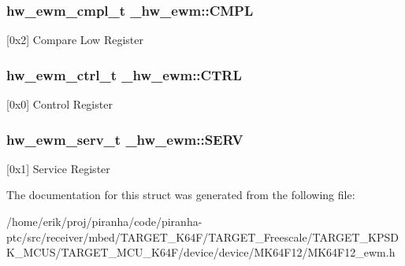 \subsubsection[{\texorpdfstring{C\+M\+PL}{CMPL}}]{ {\bf hw\+\_\+ewm\+\_\+cmpl\+\_\+t} \+\_\+hw\+\_\+ewm\+::\+C\+M\+PL}\hypertarget{struct__hw__ewm_abe87b37dd112e8bbe5023041258a0a6f}{}\label{struct__hw__ewm_abe87b37dd112e8bbe5023041258a0a6f}
\mbox{[}0x2\mbox{]} Compare Low Register 
\subsubsection[{\texorpdfstring{C\+T\+RL}{CTRL}}]{ {\bf hw\+\_\+ewm\+\_\+ctrl\+\_\+t} \+\_\+hw\+\_\+ewm\+::\+C\+T\+RL}\hypertarget{struct__hw__ewm_ac8edf0c9d475db1c8bf516c1b42b4a78}{}\label{struct__hw__ewm_ac8edf0c9d475db1c8bf516c1b42b4a78}
\mbox{[}0x0\mbox{]} Control Register 
\subsubsection[{\texorpdfstring{S\+E\+RV}{SERV}}]{ {\bf hw\+\_\+ewm\+\_\+serv\+\_\+t} \+\_\+hw\+\_\+ewm\+::\+S\+E\+RV}\hypertarget{struct__hw__ewm_a496cafa0c4c7857ae668b1f17a7d4944}{}\label{struct__hw__ewm_a496cafa0c4c7857ae668b1f17a7d4944}
\mbox{[}0x1\mbox{]} Service Register 

The documentation for this struct was generated from the following file\+:\begin{DoxyCompactItemize}
\item 
/home/erik/proj/piranha/code/piranha-\/ptc/src/receiver/mbed/\+T\+A\+R\+G\+E\+T\+\_\+\+K64\+F/\+T\+A\+R\+G\+E\+T\+\_\+\+Freescale/\+T\+A\+R\+G\+E\+T\+\_\+\+K\+P\+S\+D\+K\+\_\+\+M\+C\+U\+S/\+T\+A\+R\+G\+E\+T\+\_\+\+M\+C\+U\+\_\+\+K64\+F/device/device/\+M\+K64\+F12/M\+K64\+F12\+\_\+ewm.\+h\end{DoxyCompactItemize}
